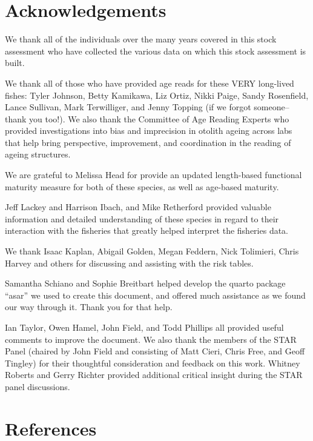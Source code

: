 \documentclass[
  english,
]{article}
\begin{document}
\newpage{} \newpage{}

\section{Acknowledgements}\label{sec-acknowledgements}

We thank all of the individuals over the many years covered in this
stock assessment who have collected the various data on which this stock
assessment is built.

We thank all of those who have provided age reads for these VERY
long-lived fishes: Tyler Johnson, Betty Kamikawa, Liz Ortiz, Nikki
Paige, Sandy Rosenfield, Lance Sullivan, Mark Terwilliger, and Jenny
Topping (if we forgot someone-- thank you too!). We also thank the
Committee of Age Reading Experts who provided investigations into bias
and imprecision in otolith ageing across labs that help bring
perspective, improvement, and coordination in the reading of ageing
structures.

We are grateful to Melissa Head for provide an updated length-based
functional maturity measure for both of these species, as well as
age-based maturity.

Jeff Lackey and Harrison Ibach, and Mike Retherford provided valuable
information and detailed understanding of these species in regard to
their interaction with the fisheries that greatly helped interpret the
fisheries data.

We thank Isaac Kaplan, Abigail Golden, Megan Feddern, Nick Tolimieri,
Chris Harvey and others for discussing and assisting with the risk
tables.

Samantha Schiano and Sophie Breitbart helped develop the quarto package
``asar'' we used to create this document, and offered much assistance as
we found our way through it. Thank you for that help.

Ian Taylor, Owen Hamel, John Field, and Todd Phillips all provided
useful comments to improve the document. We also thank the members of
the STAR Panel (chaired by John Field and consisting of Matt Cieri,
Chris Free, and Geoff Tingley) for their thoughtful consideration and
feedback on this work. Whitney Roberts and Gerry Richter provided
additional critical insight during the STAR panel discussions.

\newpage{}

\section{References}\label{references}
\end{document}
